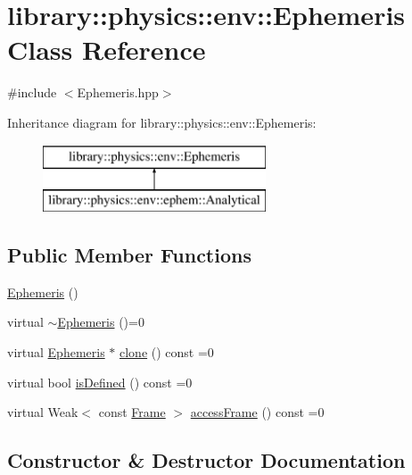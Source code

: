 \hypertarget{classlibrary_1_1physics_1_1env_1_1_ephemeris}{}\section{library\+:\+:physics\+:\+:env\+:\+:Ephemeris Class Reference}
\label{classlibrary_1_1physics_1_1env_1_1_ephemeris}


{\ttfamily \#include $<$Ephemeris.\+hpp$>$}

Inheritance diagram for library\+:\+:physics\+:\+:env\+:\+:Ephemeris\+:\begin{figure}[H]
\begin{center}
\leavevmode
\includegraphics[height=2.000000cm]{classlibrary_1_1physics_1_1env_1_1_ephemeris}
\end{center}
\end{figure}
\subsection*{Public Member Functions}
\begin{DoxyCompactItemize}
\item 
\hyperlink{classlibrary_1_1physics_1_1env_1_1_ephemeris_a99282f212b17cc6a4eb63f99e6b16f69}{Ephemeris} ()
\item 
virtual \hyperlink{classlibrary_1_1physics_1_1env_1_1_ephemeris_af2459c2cc219c926f18e540fd0ebbaac}{$\sim$\+Ephemeris} ()=0
\item 
virtual \hyperlink{classlibrary_1_1physics_1_1env_1_1_ephemeris}{Ephemeris} $\ast$ \hyperlink{classlibrary_1_1physics_1_1env_1_1_ephemeris_a7ddecd88d91f79ff204100eb9607b591}{clone} () const =0
\item 
virtual bool \hyperlink{classlibrary_1_1physics_1_1env_1_1_ephemeris_abf61a03e24dd146199381db14d1d7c68}{is\+Defined} () const =0
\item 
virtual Weak$<$ const \hyperlink{classlibrary_1_1physics_1_1coord_1_1_frame}{Frame} $>$ \hyperlink{classlibrary_1_1physics_1_1env_1_1_ephemeris_a62109772f7673764f31a496ec9a52a27}{access\+Frame} () const =0
\end{DoxyCompactItemize}


\subsection{Constructor \& Destructor Documentation}
\mbox{\label{classlibrary_1_1physics_1_1env_1_1_ephemeris_a99282f212b17cc6a4eb63f99e6b16f69}} 
